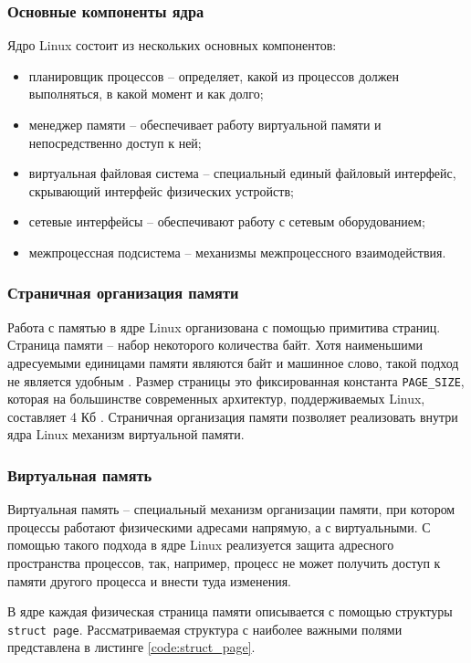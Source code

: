 \subsubsection{Основные компоненты ядра}

Ядро Linux состоит из нескольких основных компонентов:

\begin{itemize}
	\item планировщик процессов -- определяет, какой из процессов должен выполняться, в какой момент и как долго;
	\item менеджер памяти -- обеспечивает работу виртуальной памяти и непосредственно доступ к ней;
	\item виртуальная файловая система -- специальный единый файловый интерфейс, скрывающий интерфейс физических устройств;
	\item сетевые интерфейсы -- обеспечивают работу с сетевым оборудованием;
	\item межпроцессная подсистема -- механизмы межпроцессного взаимодействия.
\end{itemize}

\subsubsection{Страничная организация памяти}

Работа с памятью в ядре Linux организована с помощью примитива страниц. Страница памяти -- набор некоторого количества байт. Хотя наименьшими адресуемыми единицами памяти являются байт и машинное слово, такой подход не является удобным \cite{kernel-development}. Размер страницы это фиксированная константа \texttt{PAGE\_SIZE}, которая на большинстве современных архитектур, поддерживаемых Linux, составляет 4 Кб \cite{4kb-page-size}. Страничная организация памяти позволяет реализовать внутри ядра Linux механизм виртуальной памяти.

\subsubsection{Виртуальная память}

Виртуальная память -- специальный механизм организации памяти, при котором процессы работают физическими адресами напрямую, а с виртуальными. С помощью такого подхода в ядре Linux реализуется защита адресного пространства процессов, так, например, процесс не может получить доступ к памяти другого процесса и внести туда изменения.

В ядре каждая физическая страница памяти описывается с помощью структуры \texttt{struct page}. Рассматриваемая структура с наиболее важными полями представлена в листинге \ref{code:struct_page}.

